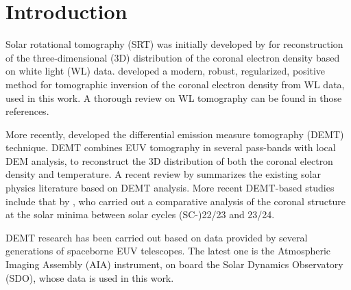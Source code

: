 \documentclass[baaa]{baaa}
\begin{document}

\maketitle

\section{Introduction}\label{intro}

Solar rotational tomography (SRT) was initially developed by \citet{altschuler_1972} for reconstruction of the three-dimensional (3D) distribution of the coronal electron density based on white light (WL) data. \citet{frazin_2002} developed a modern, robust, regularized, positive method for tomographic inversion of the coronal electron density from WL data, used in this work. A thorough review on WL tomography can be found in those references.

More recently, \citet{frazin_2009} developed the differential emission measure tomography (DEMT) technique. DEMT combines EUV tomography in several pass-bands with local DEM analysis, to reconstruct the 3D distribution of both the coronal electron density and temperature. A recent review by \citet{vasquez_2016} summarizes the existing solar physics literature based on DEMT analysis. {More recent DEMT-based studies include that by} \citet{lloveras_2017}, who carried out a comparative analysis of the coronal structure at the solar minima between solar cycles (SC-)22/23 and 23/24.

DEMT research has been carried out based on data provided by several generations of spaceborne EUV telescopes. The latest one is the Atmospheric Imaging Assembly (AIA) instrument, on board the Solar Dynamics Observatory (SDO), whose data is used in this work.
\end{document}
